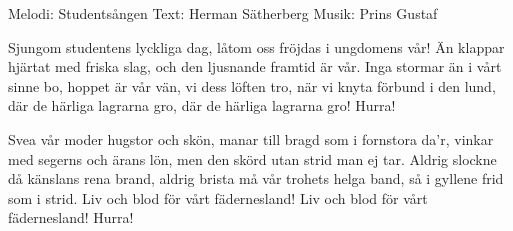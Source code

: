 \begin{song}

\begin{songmeta}
Melodi: Studentsången
Text: Herman Sätherberg
Musik: Prins Gustaf
\end{songmeta}

\begin{songtext}
Sjungom studentens lyckliga dag,
låtom oss fröjdas i ungdomens vår!
Än klappar hjärtat med friska slag,
och den ljusnande framtid är vår.
Inga stormar än
i vårt sinne bo,
hoppet är vår vän,
vi dess löften tro,
när vi knyta förbund i den lund,
där de härliga lagrarna gro,
där de härliga lagrarna gro!
Hurra!

Svea vår moder hugstor och skön,
manar till bragd som i fornstora da'r,
vinkar med segerns och ärans lön,
men den skörd utan strid man ej tar.
Aldrig slockne då
känslans rena brand,
aldrig brista må
vår trohets helga band,
så i gyllene frid som i strid.
Liv och blod för vårt fädernesland!
Liv och blod för vårt fädernesland!
Hurra!
\end{songtext}
\end{song}
